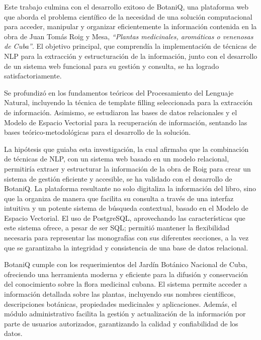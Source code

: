 \begin{conclusions}
    Este trabajo culmina con el desarrollo exitoso de BotaniQ, una plataforma web 
    que aborda el problema científico de la necesidad de una solución computacional 
    para acceder, manipular y organizar eficientemente la información contenida 
    en la obra de Juan Tomás Roig y Mesa, 
    \textit{``Plantas medicinales, aromáticas o venenosas de Cuba''}. 
    El objetivo principal, que comprendía la implementación de técnicas de NLP para 
    la extracción y estructuración de la información, junto con el desarrollo de 
    un sistema web funcional para su gestión y consulta, se ha logrado satisfactoriamente.

    Se profundizó en los fundamentos teóricos del Procesamiento del Lenguaje Natural, 
    incluyendo la técnica de template filling seleccionada para la extracción de información. 
    Asimismo, se estudiaron las bases de datos relacionales y el Modelo de Espacio Vectorial 
    para la recuperación de información, sentando las bases teórico-metodológicas para el 
    desarrollo de la solución.

    La hipótesis que guiaba esta investigación, la cual afirmaba que la combinación 
    de técnicas de NLP, con un sistema web basado en un modelo relacional, permitiría 
    extraer y estructurar la información de la obra de Roig para crear un sistema 
    de gestión eficiente y accesible, se ha validado con el desarrollo de BotaniQ. 
    La plataforma resultante no solo digitaliza la información del libro, sino que 
    la organiza de manera que facilita su consulta a través de una interfaz intuitiva 
    y un potente sistema de búsqueda contextual, basado en el Modelo de Espacio Vectorial. 
    El uso de PostgreSQL, aprovechando las características que este sistema ofrece, 
    a pesar de ser SQL; permitió mantener la flexibilidad necesaria para representar las monografías 
    con sus diferentes secciones, a la vez que se garantizaba la integridad y 
    consistencia de una base de datos relacional.

    BotaniQ cumple con los requerimientos del Jardín Botánico Nacional de Cuba, 
    ofreciendo una herramienta moderna y eficiente para la difusión y conservación del 
    conocimiento sobre la flora medicinal cubana. El sistema permite acceder a información 
    detallada sobre las plantas, incluyendo sus nombres científicos, descripciones botánicas, 
    propiedades medicinales y aplicaciones. Además, el módulo administrativo facilita 
    la gestión y actualización de la información por parte de usuarios autorizados, 
    garantizando la calidad y confiabilidad de los datos.


\end{conclusions}
